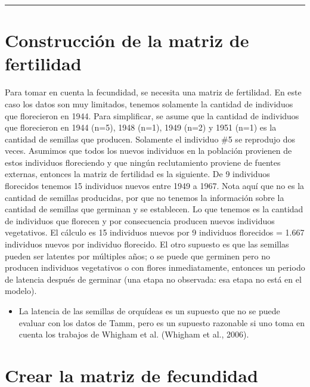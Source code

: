 \documentclass[
  12pt,
  letterpaper,
]{book}
\providecommand{\tightlist}{%
  \setlength{\itemsep}{0pt}\setlength{\parskip}{0pt}}\usepackage{longtable,booktabs,array}
\begin{document}
\begin{center}\rule{0.5\linewidth}{0.5pt}\end{center}

\section{Construcción de la matriz de
fertilidad}\label{construcciuxf3n-de-la-matriz-de-fertilidad}

Para tomar en cuenta la fecundidad, se necesita una matriz de
fertilidad. En este caso los datos son muy limitados, tenemos solamente
la cantidad de individuos que florecieron en 1944. Para simplificar, se
asume que la cantidad de individuos que florecieron en 1944 (n=5), 1948
(n=1), 1949 (n=2) y 1951 (n=1) es la cantidad de semillas que producen.
Solamente el individuo \#5 se reprodujo dos veces. Asumimos que todos
los nuevos individuos en la población provienen de estos individuos
floreciendo y que ningún reclutamiento proviene de fuentes externas,
entonces la matriz de fertilidad es la siguiente. De 9 individuos
florecidos tenemos 15 individuos nuevos entre 1949 a 1967. Nota aquí que
no es la cantidad de semillas producidas, por que no tenemos la
información sobre la cantidad de semillas que germinan y se establecen.
Lo que tenemos es la cantidad de individuos que florecen y por
consecuencia producen nuevos individuos vegetativos. El cálculo es 15
individuos nuevos por 9 individuos florecidos = 1.667 individuos nuevos
por individuo florecido. El otro supuesto es que las semillas pueden ser
latentes por múltiples años; o se puede que germinen pero no producen
individuos vegetativos o con flores inmediatamente, entonces un periodo
de latencia después de germinar (una etapa no observada: esa etapa no
está en el modelo).

\begin{itemize}
\tightlist
\item
  La latencia de las semillas de orquídeas es un supuesto que no se
  puede evaluar con los datos de Tamm, pero es un supuesto razonable si
  uno toma en cuenta los trabajos de Whigham et al. (Whigham et al.,
  2006).
\end{itemize}

\section{Crear la matriz de
fecundidad}\label{crear-la-matriz-de-fecundidad}
\end{document}
